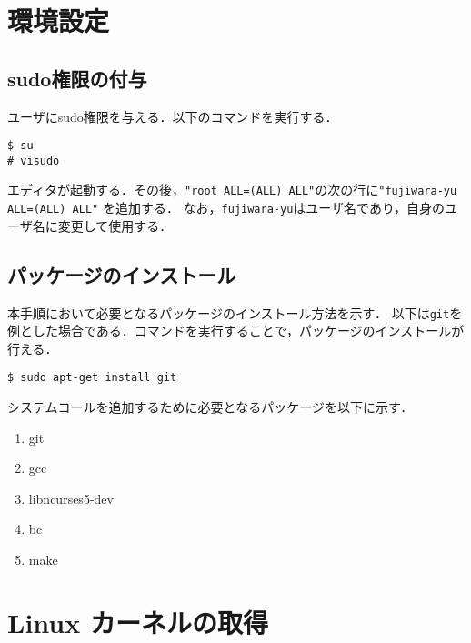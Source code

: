 \documentclass[12pt]{jsarticle}
\begin{document}
\section{環境設定}\label{sec:config}
\subsection{sudo権限の付与}
ユーザにsudo権限を与える．以下のコマンドを実行する．
\begin{verbatim}
$ su
# visudo
\end{verbatim}
エディタが起動する．その後，\verb|"root ALL=(ALL) ALL"|の次の行に\verb|"fujiwara-yu ALL=(ALL) ALL"| を追加する．
なお，\verb|fujiwara-yu|はユーザ名であり，自身のユーザ名に変更して使用する．

\subsection{パッケージのインストール}
本手順において必要となるパッケージのインストール方法を示す．
以下は\verb|git|を例とした場合である．コマンドを実行することで，パッケージのインストールが行える．
\begin{verbatim}
$ sudo apt-get install git
\end{verbatim}
システムコールを追加するために必要となるパッケージを以下に示す．
\begin{enumerate}
\item git
\item gcc
\item libncurses5-dev
\item bc
\item make
\end{enumerate}

\section{Linux カーネルの取得}\label{sec:kernel}
\end{document}
